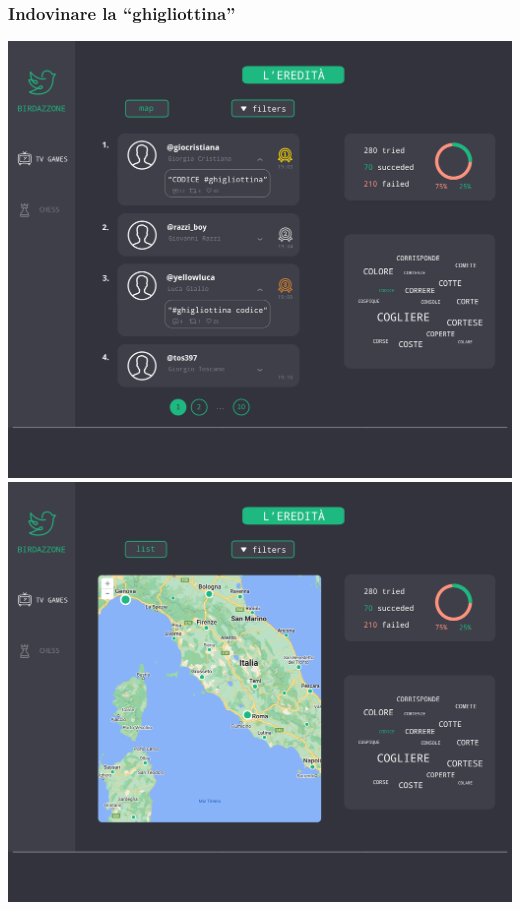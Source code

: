 \documentclass{article}
\begin{document}
\subsubsection{Indovinare la ``ghigliottina''}

\includegraphics[width=\textwidth]{mock-ghigliottina-tweet-list}
\includegraphics[width=\textwidth]{mock-ghigliottina-map}
\end{document}
